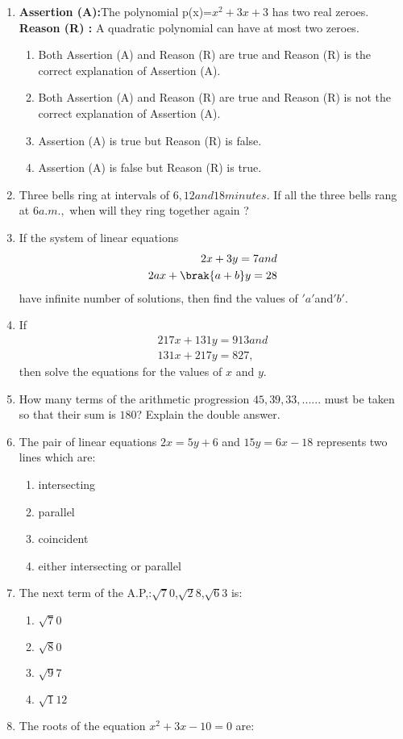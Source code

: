 \begin{enumerate}
\item \textbf{Assertion (A):}The polynomial p(x)=$x^{2}+3x+3$ has two real zeroes.
	\\\textbf{Reason (R) :} A quadratic polynomial can have at most two zeroes.
\begin{enumerate}
\item Both Assertion (A) and Reason (R) are true and Reason (R) is the correct explanation of Assertion (A). 
\item Both Assertion (A) and Reason (R) are true and Reason (R) is not the correct explanation of Assertion (A).
\item Assertion (A) is true but Reason (R) is false.
\item Assertion (A) is false but Reason (R) is true.
\end{enumerate}

\item Three bells ring at intervals of $ 6, 12 and 18 minutes$. If all the three bells rang at $ 6 a.m.,$ when will they ring together again ?

\item If the system of linear equations  \\ 		
\begin{align}
		2x + 3y = 7 and \\ 
		2ax + \brak{a+b}y = 28
\end{align}
\text have infinite number of solutions, then find the values of $' a '$and$' b '$.

\item If
\begin{align}
	 217x + 131y = 913 and \\
         131x + 217y = 827,
\end{align}
 then solve the equations for the values of $x$ and $y$.

\item How many terms of the arithmetic progression $45,39,33,......$ must be taken so that their sum is $180$? Explain the double answer.
	 \item The pair of linear equations $2x = 5y + 6$ and $15y = 6x - 18$ represents two lines which are:
    \begin{enumerate}
        \item intersecting
        \item parallel
        \item coincident
        \item either intersecting or parallel
    \end{enumerate}
    \item The next term of the A.P,:$\sqrt 70$,$\sqrt 28$,$\sqrt 63$ is:
	\begin{enumerate}
        \item $\sqrt 70$
	\item $\sqrt 80$
	\item $\sqrt 97$
	\item $\sqrt 112$
\end{enumerate}
\item The roots of the equation $x^2 + 3x - 10 = 0$ are:


\end{enumerate}
